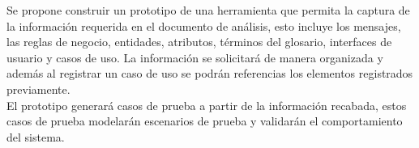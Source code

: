 Se propone construir un prototipo de una herramienta que permita la captura de la información requerida en el documento de análisis, 
esto incluye los mensajes, las reglas de negocio, entidades, atributos, términos del glosario, interfaces de usuario y casos de uso. La información se solicitará de 
manera organizada y además al registrar un caso de uso se podrán referencias los elementos registrados previamente.\\

El prototipo generará casos de prueba a partir de la información recabada, estos casos de prueba modelarán escenarios 
de prueba y validarán el comportamiento del sistema. \\


